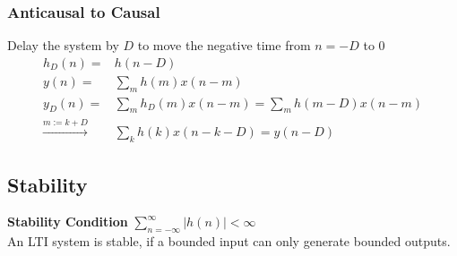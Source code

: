\subsubsection{Anticausal to Causal}
Delay the system by $D$ to move the negative time from $n=-D$ to $0$
\begin{align*}
h_D(n) =& h(n-D)\\
y(n) =& \sum\limits_{m}h(m)x(n-m) \\
y_D(n) = & \sum\limits_{m}h_D(m)x(n-m) = \sum\limits_{m}h(m-D)x(n-m) \\ 
\xrightarrow{m := k+D}& \sum\limits_{k}h(k)x(n-k-D) = y(n-D)
\end{align*}

\subsection{Stability}
\textbf{Stability Condition} $\sum\limits_{n=-\infty}^{\infty}\left| h(n)
\right| < \infty$\\
An LTI system is stable, if a bounded input can only generate bounded outputs.\\
